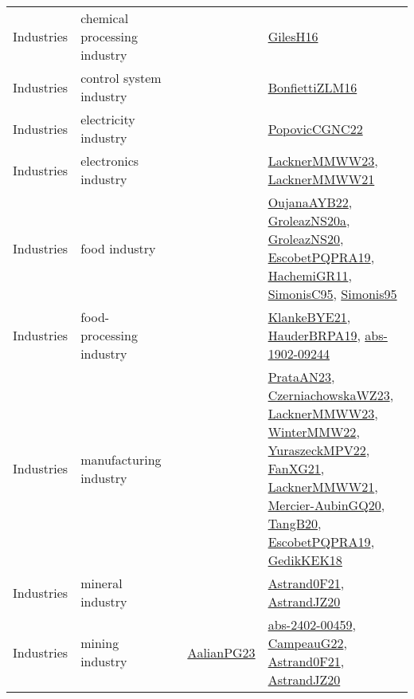 {\begin{longtable}{lp{3cm}>{\raggedright}p{6cm}>{\raggedright}p{6cm}p{8cm}}
Industries & chemical processing industry &  &  & \href{papers/GilesH16.pdf}{GilesH16}\cite{GilesH16}\\
Industries & control system industry &  &  & \href{papers/BonfiettiZLM16.pdf}{BonfiettiZLM16}\cite{BonfiettiZLM16}\\
Industries & electricity industry &  &  & \href{papers/PopovicCGNC22.pdf}{PopovicCGNC22}\cite{PopovicCGNC22}\\
Industries & electronics industry &  &  & \href{articles/LacknerMMWW23.pdf}{LacknerMMWW23}\cite{LacknerMMWW23}, \href{papers/LacknerMMWW21.pdf}{LacknerMMWW21}\cite{LacknerMMWW21}\\
Industries & food industry &  &  & \href{papers/OujanaAYB22.pdf}{OujanaAYB22}\cite{OujanaAYB22}, \href{papers/GroleazNS20a.pdf}{GroleazNS20a}\cite{GroleazNS20a}, \href{papers/GroleazNS20.pdf}{GroleazNS20}\cite{GroleazNS20}, \href{articles/EscobetPQPRA19.pdf}{EscobetPQPRA19}\cite{EscobetPQPRA19}, \href{articles/HachemiGR11.pdf}{HachemiGR11}\cite{HachemiGR11}, \href{papers/SimonisC95.pdf}{SimonisC95}\cite{SimonisC95}, \href{papers/Simonis95.pdf}{Simonis95}\cite{Simonis95}\\
Industries & food-processing industry &  &  & \href{papers/KlankeBYE21.pdf}{KlankeBYE21}\cite{KlankeBYE21}, \href{articles/HauderBRPA19.pdf}{HauderBRPA19}\cite{HauderBRPA19}, \href{articles/abs-1902-09244.pdf}{abs-1902-09244}\cite{abs-1902-09244}\\
Industries & manufacturing industry &  &  & \href{articles/PrataAN23.pdf}{PrataAN23}\cite{PrataAN23}, \href{articles/CzerniachowskaWZ23.pdf}{CzerniachowskaWZ23}\cite{CzerniachowskaWZ23}, \href{articles/LacknerMMWW23.pdf}{LacknerMMWW23}\cite{LacknerMMWW23}, \href{papers/WinterMMW22.pdf}{WinterMMW22}\cite{WinterMMW22}, \href{articles/YuraszeckMPV22.pdf}{YuraszeckMPV22}\cite{YuraszeckMPV22}, \href{articles/FanXG21.pdf}{FanXG21}\cite{FanXG21}, \href{papers/LacknerMMWW21.pdf}{LacknerMMWW21}\cite{LacknerMMWW21}, \href{papers/Mercier-AubinGQ20.pdf}{Mercier-AubinGQ20}\cite{Mercier-AubinGQ20}, \href{papers/TangB20.pdf}{TangB20}\cite{TangB20}, \href{articles/EscobetPQPRA19.pdf}{EscobetPQPRA19}\cite{EscobetPQPRA19}, \href{articles/GedikKEK18.pdf}{GedikKEK18}\cite{GedikKEK18}\\
Industries & mineral industry &  &  & \href{papers/Astrand0F21.pdf}{Astrand0F21}\cite{Astrand0F21}, \href{articles/AstrandJZ20.pdf}{AstrandJZ20}\cite{AstrandJZ20}\\
Industries & mining industry &  & \href{papers/AalianPG23.pdf}{AalianPG23}\cite{AalianPG23} & \href{articles/abs-2402-00459.pdf}{abs-2402-00459}\cite{abs-2402-00459}, \href{articles/CampeauG22.pdf}{CampeauG22}\cite{CampeauG22}, \href{papers/Astrand0F21.pdf}{Astrand0F21}\cite{Astrand0F21}, \href{articles/AstrandJZ20.pdf}{AstrandJZ20}\cite{AstrandJZ20}\\

\end{longtable}}
